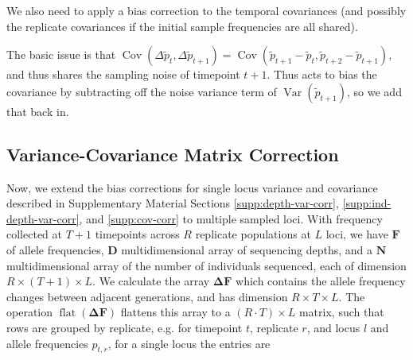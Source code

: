 \documentclass[11pt]{article}
\DeclareMathOperator{\var}{Var}
\DeclareMathOperator{\cov}{Cov}
\DeclareMathOperator{\flt}{\mathrm{flat}}
\begin{document}
We also need to apply a bias correction to the temporal covariances (and
possibly the replicate covariances if the initial sample frequencies are all
shared).

The basic issue is that $\cov(\Delta \widetilde{p}_t, \Delta
\widetilde{p}_{t+1}) = \cov(\widetilde{p}_{t+1} - \widetilde{p}_t,
\widetilde{p}_{t+2} - \widetilde{p}_{t+1})$, and thus shares the sampling noise
of timepoint $t+1$. Thus acts to bias the covariance by subtracting off the
noise variance term of $\var(\widetilde{p}_{t+1})$, so we add that back in.

\subsection{Variance-Covariance Matrix Correction}

Now, we extend the bias corrections for single locus variance and covariance
described in Supplementary Material Sections \ref{supp:depth-var-corr},
\ref{supp:ind-depth-var-corr}, and \ref{supp:cov-corr} to multiple sampled
loci. With frequency collected at $T+1$ timepoints across $R$ replicate
populations at $L$ loci, we have $\mathbf{F}$ of allele frequencies,
$\mathbf{D}$ multidimensional array of sequencing depths, and a $\mathbf{N}$
multidimensional array of the number of individuals sequenced, each of
dimension $R \times (T+1) \times L$.  We calculate the array $\mathbf{\Delta
F}$ which contains the allele frequency changes between adjacent generations,
and has dimension $R \times T \times L$.  The operation
$\flt(\mathbf{\Delta}\mathbf{F})$ flattens this array to a $(R \cdot T) \times
L$ matrix, such that rows are grouped by replicate, e.g. for timepoint $t$,
replicate $r$, and locus $l$ and allele frequencies $p_{t, r}$, for a single
locus the entries are 

\end{document}
